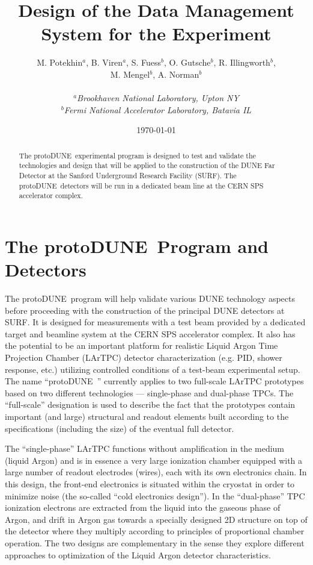 \documentclass[pdftex,12pt,letter]{article}
\title{Design of the Data Management System for the \pd Experiment}
\date{\today}
\author{M. Potekhin$^a$, B. Viren$^a$, S. Fuess$^b$, O. Gutsche$^b$, R. Illingworth$^b$,\\M. Mengel$^b$,
 A. Norman$^b$\\
\ \\
$^a$\textit{Brookhaven National Laboratory, Upton NY}\\
$^b$\textit{Fermi National Accelerator Laboratory, Batavia IL}}
\newcommand{\pd}{protoDUNE\ }
\begin{document}
\maketitle

\begin{abstract}
The \pd experimental program is designed to test and validate the technologies and design that will be applied to the construction
of the DUNE Far Detector at the Sanford Underground Research Facility (SURF).  The \pd detectors will be run in a dedicated beam line
at the CERN SPS accelerator complex. 
\end{abstract}


\section{The \pd Program and Detectors}
\label{S:1}

The \pd program will help validate various DUNE technology aspects before proceeding with the construction of the principal DUNE detectors at SURF.
It is designed for measurements with a test beam provided by a dedicated target and beamline system at the CERN SPS accelerator complex.
It also has the potential to be an important platform for realistic Liquid Argon Time Projection Chamber (LArTPC) detector characterization
(e.g. PID, shower response, etc.) utilizing controlled conditions of a test-beam experimental setup. The name ``\pd'' currently applies to two
full-scale LArTPC prototypes based on two different technologies --- single-phase and dual-phase TPCs.
The ``full-scale'' designation is used to describe the fact that the prototypes
contain important (and large) structural and readout elements built according to the specifications (including the size)
of the eventual full detector.

The ``single-phase''  LArTPC functions without amplification in the medium (liquid Argon) and is in essence a very large ionization chamber
equipped with a large number of readout electrodes (wires), each with its own electronics chain. In this design, the front-end electronics is
situated within the cryostat in order to minimize noise (the so-called ``cold electronics design''). In the ``dual-phase''  TPC ionization
electrons are extracted from the liquid into the gaseous phase of Argon, and drift in Argon gas towards a specially designed 2D structure
on top of the detector where they multiply according to principles of proportional chamber operation. The two designs are complementary
in the sense they explore different approaches to optimization of the Liquid Argon detector characteristics.
\end{document}
